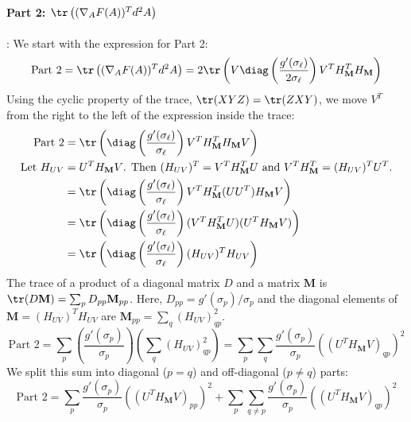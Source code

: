 \paragraph{Part 2: $\tr\left((\nabla_A F(A))^T d^2A\right)$}:
We start with the expression for Part 2:
$$\text{Part 2} = \tr\left((\nabla_A F(A))^T d^2A\right) = 2 \tr\left( V \diag\left(\frac{g'(\sigma_\ell)}{2\sigma_\ell}\right) V^T H_{\mathbf{M}}^T H_{\mathbf{M}} \right)$$
Using the cyclic property of the trace, $\tr(XYZ) = \tr(ZXY)$, we move $V^T$ from the right to the left of the expression inside the trace:
\begin{align*}
\text{Part 2} &= \tr\left( \diag\left(\frac{g'(\sigma_\ell)}{\sigma_\ell}\right) V^T H_{\mathbf{M}}^T H_{\mathbf{M}} V \right) \\
\text{Let } H_{UV} &= U^T H_{\mathbf{M}} V \text{. Then } (H_{UV})^T = V^T H_{\mathbf{M}}^T U \text{ and } V^T H_{\mathbf{M}}^T = (H_{UV})^T U^T. \\
&= \tr\left( \diag\left(\frac{g'(\sigma_\ell)}{\sigma_\ell}\right) V^T H_{\mathbf{M}}^T (U U^T) H_{\mathbf{M}} V \right) \\
&= \tr\left( \diag\left(\frac{g'(\sigma_\ell)}{\sigma_\ell}\right) (V^T H_{\mathbf{M}}^T U) (U^T H_{\mathbf{M}} V) \right) \\
&= \tr\left( \diag\left(\frac{g'(\sigma_\ell)}{\sigma_\ell}\right) (H_{UV})^T H_{UV} \right)
\end{align*}
The trace of a product of a diagonal matrix $D$ and a matrix $\mathbf{M}$ is $\tr(D\mathbf{M}) = \sum_p D_{pp} \mathbf{M}_{pp}$. Here, $D_{pp} = g'(\sigma_p)/\sigma_p$ and the diagonal elements of $\mathbf{M} = (H_{UV})^T H_{UV}$ are $\mathbf{M}_{pp} = \sum_q (H_{UV})_{qp}^2$.
$$\text{Part 2} = \sum_p \left( \frac{g'(\sigma_p)}{\sigma_p} \right) \left( \sum_q (H_{UV})_{qp}^2 \right) = \sum_p \sum_q \frac{g'(\sigma_p)}{\sigma_p} ((U^T H_{\mathbf{M}} V)_{qp})^2$$
We split this sum into diagonal ($p=q$) and off-diagonal ($p \neq q$) parts:
$$\text{Part 2} = \sum_p \frac{g'(\sigma_p)}{\sigma_p} ((U^T H_{\mathbf{M}} V)_{pp})^2 + \sum_p \sum_{q \neq p} \frac{g'(\sigma_p)}{\sigma_p} ((U^T H_{\mathbf{M}} V)_{qp})^2$$

